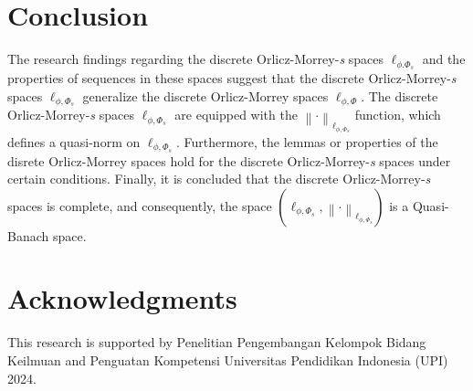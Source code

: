 \documentclass[12pt,a4paper]{article}
\theoremstyle{remark}
\begin{document}
\section{Conclusion}
The research findings regarding the discrete Orlicz-Morrey-\emph{s} spaces $\ell_{\phi. \Phi_s}$ and the properties of sequences in these spaces suggest that the discrete Orlicz-Morrey-\emph{s} spaces $\ell_{\phi, \Phi_s}$ generalize the discrete Orlicz-Morrey spaces $\ell_{\phi, \Phi}$. The discrete Orlicz-Morrey-\emph{s} spaces $\ell_{\phi, \Phi_s}$ are equipped with the $\left\lVert \cdot \right\rVert _{\ell_{\phi, \Phi_s}}$ function, which defines a quasi-norm on $\ell_{\phi, \Phi_s}$. Furthermore, the lemmas or properties of the disrete Orlicz-Morrey spaces hold for the discrete Orlicz-Morrey-\emph{s} spaces under certain conditions. Finally, it is concluded that the discrete Orlicz-Morrey-\emph{s} spaces is complete, and consequently, the space $\left(\ell_{\phi, \Phi_s}, \left\lVert \cdot \right\rVert_{\ell_{\phi, \Phi_s}}\right)$ is a Quasi-Banach space.

\section*{Acknowledgments}
This research is supported by Penelitian Pengembangan Kelompok Bidang Keilmuan and Penguatan Kompetensi Universitas Pendidikan Indonesia (UPI) 2024.



\end{document}
